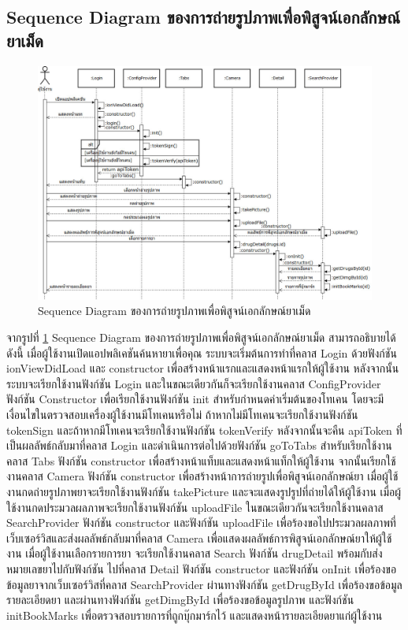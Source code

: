 	\subsection{Sequence Diagram ของการถ่ายรูปภาพเพื่อพิสูจน์เอกลักษณ์ยาเม็ด}	

	\begin{figure}[H]
		\includegraphics[width=\columnwidth]{Figures/3/Sequence-3}
		\caption{Sequence Diagram ของการถ่ายรูปภาพเพื่อพิสูจน์เอกลักษณ์ยาเม็ด}
		\label{Fig:Sequence-3}
	\end{figure}

	จากรูปที่ \ref{Fig:Sequence-3} Sequence Diagram ของการถ่ายรูปภาพเพื่อพิสูจน์เอกลักษณ์ยาเม็ด สามารถอธิบายได้ดังนี้ เมื่อผู้ใช้งานเปิดแอปพลิเคชันค้นหายาเพื่อคุณ ระบบจะเริ่มต้นการทำที่คลาส Login ด้วยฟังก์ชัน ionViewDidLoad และ constructor เพื่อสร้างหน้าแรกและแสดงหน้าแรกให้ผู้ใช้งาน หลังจากนั้นระบบจะเรียกใช้งานฟังก์ชัน Login และในขณะเดียวกันก็จะเรียกใช้งานคลาส ConfigProvider ฟังก์ชัน Constructor เพื่อเรียกใช้งานฟังก์ชัน init สำหรับกำหนดค่าเริ่มต้นของโทเคน โดยจะมีเงื่อนไขในตรวจสอบเครื่องผู้ใช้งานมีโทเคนหรือไม่ ถ้าหากไม่มีโทเคนจะเรียกใช้งานฟังก์ชัน tokenSign และถ้าหากมีโทเคนจะเรียกใช้งานฟังก์ชัน tokenVerify หลังจากนั้นจะคืน apiToken ที่เป็นผลลัพธ์กลับมาที่คลาส Login และดำเนินการต่อไปด้วยฟังก์ชัน goToTabs สำหรับเรียกใช้งานคลาส Tabs ฟังก์ชัน constructor เพื่อสร้างหน้าแท็บและแสดงหน้าแท็กให้ผู้ใช้งาน จากนั้นเรียกใช้งานคลาส Camera ฟังก์ชัน constructor เพื่อสร้างหน้าการถ่ายรูปเพื่อพิสูจน์เอกลักษณ์ยา เมื่อผู้ใช้งานกดถ่ายรูปภาพยาจะเรียกใช้งานฟังก์ชัน takePicture และจะแสดงรูปรูปที่ถ่ายได้ให้ผู้ใช้งาน เมื่อผู้ใช้งานกดประมวลผลภาพจะเรียกใช้งานฟังก์ชัน uploadFile ในขณะเดียวกันจะเรียกใช้งานคลาส SearchProvider ฟังก์ชัน constructor และฟังก์ชัน uploadFile เพื่อร้องขอไปประมวลผลภาพที่เว็บเซอร์วิสและส่งผลลัพธ์กลับมาที่คลาส Camera เพื่อแสดงผลลัพธ์การพิสูจน์เอกลักษณ์ยาให้ผู้ใช้งาน เมื่อผู้ใช้งานเลือกรายการยา จะเรียกใช้งานคลาส Search ฟังก์ชัน drugDetail พร้อมกับส่งหมายเลขยาไปกับฟังก์ชัน ไปที่คลาส Detail ฟังก์ชัน constructor และฟังก์ชัน onInit เพื่อร้องขอข้อมูลยาจากเว็บเซอร์วิสที่คลาส SearchProvider ผ่านทางฟังก์ชัน getDrugById เพื่อร้องขอข้อมูลรายละเอียดยา และผ่านทางฟังก์ชัน getDimgById เพื่อร้องขอข้อมูลรูปภาพ และฟังก์ชัน initBookMarks เพื่อตรวจสอบรายการที่ถูกบุ๊กมาร์กไว้ และแสดงหน้ารายละเอียดยาแก่ผู้ใช้งาน
	
